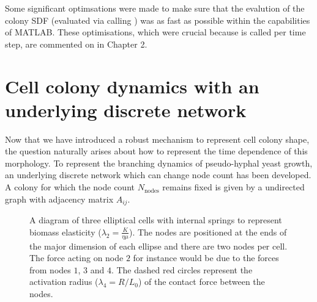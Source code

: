 Some significant optimsations were made to make sure that the evalution of 
the colony SDF (evaluated via calling ) was as fast as 
possible within the capabilities of MATLAB. These 
optimisations, which were crucial because  is called per time step, 
are commented on in Chapter 2.

\section{Cell colony dynamics with an underlying discrete network}
Now that we have introduced a robust mechanism to represent cell colony 
shape, the question naturally arises about how to represent the time dependence of this 
morphology. To represent the branching dynamics of pseudo-hyphal yeast growth, 
an underlying discrete network which can change node count has been developed.
A colony for which the node count $N_{\textrm{nodes}}$ remains fixed is given 
by a undirected graph with adjacency matrix $A_{ij}$.
\\


\begin{figure}[h]
    \centering
    \caption{A diagram of three elliptical cells with internal springs to represent biomass 
             elasticity ($\lambda_2 = \frac{K}{\eta \mu}$). The nodes are positioned at the ends of the major dimension
             of each ellipse and there are two nodes per cell. The force acting on 
             node $2$ for instance would be due to the forces from nodes $1$, $3$ and $4$.
             The dashed red circles represent the activation radius ($ \lambda_4 = R/L_0$) 
             of the contact force between the nodes.}
\end{figure}

